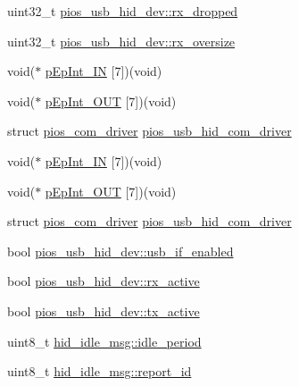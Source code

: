 \begin{DoxyCompactItemize}
\item 
uint32\-\_\-t \hyperlink{group___p_i_o_s___u_s_b___h_i_d_ga4ecf07921bfe18b2457b8d0c4c874990}{pios\-\_\-usb\-\_\-hid\-\_\-dev\-::rx\-\_\-dropped}
\item 
uint32\-\_\-t \hyperlink{group___p_i_o_s___u_s_b___h_i_d_gaddc9bf1640b3a06aff88c4adaa6d3601}{pios\-\_\-usb\-\_\-hid\-\_\-dev\-::rx\-\_\-oversize}
\item 
void($\ast$ \hyperlink{group___p_i_o_s___u_s_b___h_i_d_ga0992c19a0f2e317fcd93f755d316a0fd}{p\-Ep\-Int\-\_\-\-I\-N} \mbox{[}7\mbox{]})(void)
\item 
void($\ast$ \hyperlink{group___p_i_o_s___u_s_b___h_i_d_ga549396ff4348c565f52117dd27ad52ca}{p\-Ep\-Int\-\_\-\-O\-U\-T} \mbox{[}7\mbox{]})(void)
\item 
struct \hyperlink{structpios__com__driver}{pios\-\_\-com\-\_\-driver} \hyperlink{group___p_i_o_s___u_s_b___h_i_d_ga7bc5f832e095cad60f463436e377bb5d}{pios\-\_\-usb\-\_\-hid\-\_\-com\-\_\-driver}
\item 
void($\ast$ \hyperlink{group___p_i_o_s___u_s_b___h_i_d_ga0992c19a0f2e317fcd93f755d316a0fd}{p\-Ep\-Int\-\_\-\-I\-N} \mbox{[}7\mbox{]})(void)
\item 
void($\ast$ \hyperlink{group___p_i_o_s___u_s_b___h_i_d_ga549396ff4348c565f52117dd27ad52ca}{p\-Ep\-Int\-\_\-\-O\-U\-T} \mbox{[}7\mbox{]})(void)
\item 
struct \hyperlink{structpios__com__driver}{pios\-\_\-com\-\_\-driver} \hyperlink{group___p_i_o_s___u_s_b___h_i_d_ga7bc5f832e095cad60f463436e377bb5d}{pios\-\_\-usb\-\_\-hid\-\_\-com\-\_\-driver}
\item 
bool \hyperlink{group___p_i_o_s___u_s_b___h_i_d_ga545cdf4f2c93727b458fa26bf4426311}{pios\-\_\-usb\-\_\-hid\-\_\-dev\-::usb\-\_\-if\-\_\-enabled}
\item 
bool \hyperlink{group___p_i_o_s___u_s_b___h_i_d_gaf4ed0035b90313acf78fada97b2ff2f5}{pios\-\_\-usb\-\_\-hid\-\_\-dev\-::rx\-\_\-active}
\item 
bool \hyperlink{group___p_i_o_s___u_s_b___h_i_d_ga3c0deaac64c0f63bdb4a5cd41379bc23}{pios\-\_\-usb\-\_\-hid\-\_\-dev\-::tx\-\_\-active}
\item 
uint8\-\_\-t \hyperlink{group___p_i_o_s___u_s_b___h_i_d_ga6f939e967dc4622730a02a7d467edf7a}{hid\-\_\-idle\-\_\-msg\-::idle\-\_\-period}
\item 
uint8\-\_\-t \hyperlink{group___p_i_o_s___u_s_b___h_i_d_gae36ecdd57567fb6f4ee28b3130b3c8ee}{hid\-\_\-idle\-\_\-msg\-::report\-\_\-id}
\end{DoxyCompactItemize}


